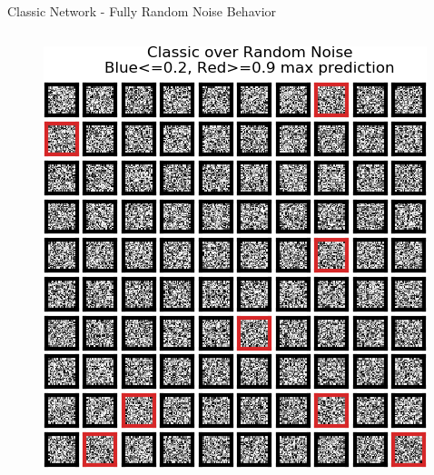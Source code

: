 \documentclass{beamer}
\begin{document}
\begin{frame}{Classic Network - Fully Random Noise Behavior}
\begin{columns}
\begin{column}{.5\textwidth}
\begin{figure}
        \includegraphics[width=.73\textwidth]{images/mnist-behavior/classic-pred-random.png}
        \caption*{}
    \end{figure}
    \end{column}
    \end{columns}
    
\end{frame}
\end{document}
